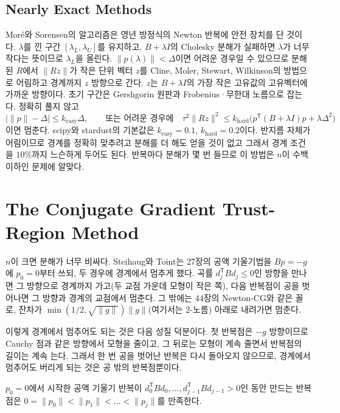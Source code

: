 \subsection{Nearly Exact Methods}

Moré와 Sorensen의 알고리즘\cite{more1983trust}은 영년 방정식의 Newton 반복에 안전 장치를 단 것이다. $\lambda$를 낀 구간 $[\lambda_L,\lambda_U]$를 유지하고, $B+\lambda I$의 Cholesky 분해가 실패하면 $\lambda$가 너무 작다는 뜻이므로 $\lambda_L$을 올린다. $\|p(\lambda)\|<\Delta$이면 어려운 경우일 수 있으므로 분해된 $R$에서 $\|Rz\|$가 작은 단위 벡터 $z$를 Cline, Moler, Stewart, Wilkinson의 방법\cite{cline1979}으로 어림하고 경계까지 $z$ 방향으로 간다. $z$는 $B+\lambda I$의 가장 작은 고유값의 고유벡터에 가까운 방향이다. 초기 구간은 Gershgorin 원판과 Frobenius·무한대 노름으로 잡는다. 정확히 풀지 않고
\[
\bigl|\|p\|-\Delta\bigr|\le k_{\mathrm{easy}}\Delta,\qquad\text{또는 어려운 경우에}\quad\tau^2\|Rz\|^2\le k_{\mathrm{hard}}\bigl(p^{\mathsf T}(B+\lambda I)p+\lambda\Delta^2\bigr)
\]
이면 멈춘다. scipy와 stardust의 기본값은 $k_{\mathrm{easy}}=0.1$, $k_{\mathrm{hard}}=0.2$이다. 반지름 자체가 어림이므로 경계를 정확히 맞추려고 분해를 더 해도 얻을 것이 없고 그래서 경계 조건을 $10\%$까지 느슨하게 두어도 된다. 반복마다 분해가 몇 번 들므로 이 방법은 $n$이 수백 이하인 문제에 알맞다.

\section{The Conjugate Gradient Trust-Region Method}
\label{sec:steihaug}

$n$이 크면 분해가 너무 비싸다. Steihaug와 Toint는 27장의 공액 기울기법을 $Bp=-g$에 $p_0=0$부터 쓰되, 두 경우에 경계에서 멈추게 했다\cite{steihaug1983,toint1981}. 곡률 $d_j^{\mathsf T}Bd_j\le0$인 방향을 만나면 그 방향으로 경계까지 가고(두 교점 가운데 모형이 작은 쪽), 다음 반복점이 공을 벗어나면 그 방향과 경계의 교점에서 멈춘다. 그 밖에는 44장의 Newton-CG와 같은 꼴로, 잔차가 $\min(1/2,\sqrt{\|g\|})\|g\|$(여기서는 2-노름) 아래로 내려가면 멈춘다.

이렇게 경계에서 멈추어도 되는 것은 다음 성질 덕분이다. 첫 반복점은 $-g$ 방향이므로 Cauchy 점과 같은 방향에서 모형을 줄이고, 그 뒤로는 모형이 계속 줄면서 반복점의 길이는 계속 는다. 그래서 한 번 공을 벗어난 반복은 다시 돌아오지 않으므로, 경계에서 멈추어도 버리게 되는 것은 공 밖의 반복점뿐이다.

\begin{proposition}[Steihaug]
\label{prop:steihaug}
$p_0=0$에서 시작한 공액 기울기 반복이 $d_0^{\mathsf T}Bd_0,\dots,d_{j-1}^{\mathsf T}Bd_{j-1}>0$인 동안 만드는 반복점은 $0=\|p_0\|<\|p_1\|<\dots<\|p_j\|$를 만족한다.
\end{proposition}

